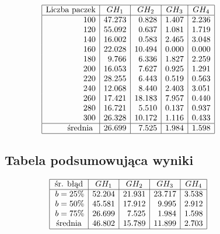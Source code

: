\documentclass[polish,polish,a4paper]{article}
\begin{document}
\begin{spacing}{1.35}
\begin{figure}[H]
\begin{spacing}{1.7}
	\begin{equation*}
	\begin{array}{|r|r|r|r|r|}
	\hline
\multicolumn{1}{|c|}{$Liczba paczek$}&\multicolumn{1}{c|}{GH_{1}}&\multicolumn{1}{c|}{GH_{2}}&\multicolumn{1}{c|}{GH_{3}}&\multicolumn{1}{c|}{GH_{4}}\\\hline
	100&47.273&0.828&1.407&2.236\\
	120&55.092&0.637&1.081&1.719\\
	140&16.002&0.583&2.465&3.048\\
	160&22.028&10.494&0.000&0.000\\
	180&9.766&6.336&1.827&2.259\\
	200&16.053&7.627&0.925&1.291\\
	220&28.255&6.443&0.519&0.563\\
	240&12.068&8.440&2.403&3.051\\
	260&17.421&18.183&7.957&0.440\\
	280&16.721&5.510&0.137&0.937\\
	300&26.328&10.172&1.116&0.433\\
	\hline
	$ średnia $&26.699&7.525&1.984&1.598\\\hline
	\end{array}
	\end{equation*}
\end{spacing}
\end{figure}


\begin{figure}[H]
			{\centering
		\subsection*{Tabela podsumowująca wyniki}}
	\begin{spacing}{1.7}

	\begin{equation*}
	\begin{array}{|r|r|r|r|r|}

	\hline
\multicolumn{1}{|c|}{$śr. błąd$}&\multicolumn{1}{c|}{GH_{1}}&\multicolumn{1}{c|}{GH_{2}}&\multicolumn{1}{c|}{GH_{3}}&\multicolumn{1}{c|}{GH_{4}}\\\hline
    b=25\%&52.204&21.931&23.717&3.538\\
b=50\%&45.581&17.912&9.995&2.912\\
	b=75\%&26.699&7.525&1.984&1.598\\
	$ średnia $&46.802&15.789&11.899&2.703\\
	\hline
	\end{array}
	\end{equation*}
\end{spacing}
\end{figure}


\end{spacing}
\end{document}
